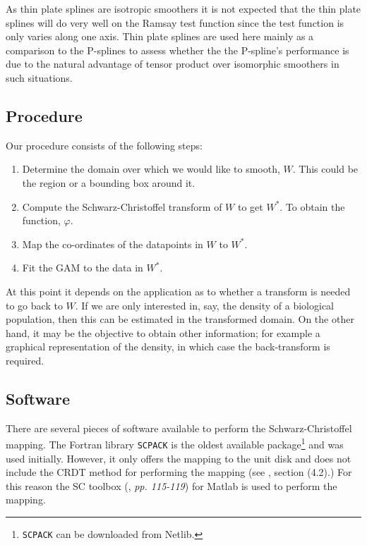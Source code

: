 \documentclass[a4paper,10pt]{amsart}
\newcommand{\sch}{Schwarz-Christoffel }
\renewcommand{\phi}{\varphi}
\begin{document}
As thin plate splines are isotropic smoothers it is not expected that the thin plate splines will do very well on the Ramsay test function since the test function is only varies along one axis. Thin plate splines are used here mainly as a comparison to the P-splines to assess whether the the P-spline's performance is due to the natural advantage of tensor product over isomorphic smoothers in such situations.

\subsection{Procedure}

Our procedure consists of the following steps:

\begin{enumerate}
\item Determine the domain over which we would like to smooth, $W$. This could be the region or a bounding box around it.

\item Compute the \sch transform of $W$ to get $W^*$. To obtain the function, $\phi$.

\item Map the co-ordinates of the datapoints in $W$ to $W^*$.

\item Fit the GAM to the data in $W^*$.
\end{enumerate}

At this point it depends on the application as to whether a transform is needed to go back to $W$. If we are only interested in, say, the density of a biological population, then this can be estimated in the transformed domain. On the other hand, it may be the objective to obtain other information; for example a graphical representation of the density, in which case the back-transform is required.

\subsection{Software}

There are several pieces of software available to perform the \sch mapping. The Fortran library \texttt{SCPACK} is the oldest available package\footnote{\texttt{SCPACK} can be downloaded from Netlib.} and was used initially. However, it only offers the mapping to the unit disk and does not include the CRDT method for performing the mapping (see \cite{miller08}, section (4.2).) For this reason the SC toolbox (\cite{driscoll}, \emph{pp. 115-119}) for Matlab is used to perform the mapping. 
\end{document}
